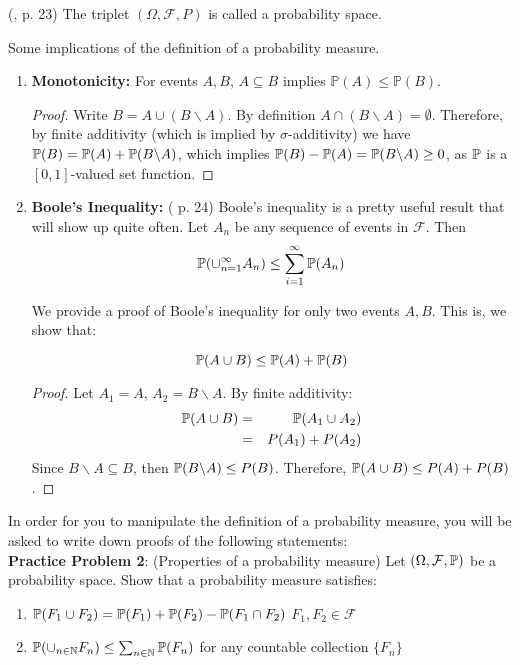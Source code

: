 \documentclass[11pt]{article} %
\begin{document}
\begin{definition} (\cite{Billingsley95}, p. 23)
The triplet $(\Omega, \mathcal{F}, P)$ is called a probability space. 
\end{definition}

Some implications of the definition of a probability measure. 

\begin{enumerate}

\item \textbf{Monotonicity:} For events $A,B$, $A \subseteq B$ implies $\mathbb{P}(A) \leq \mathbb{P}(B)$.

\begin{proof}
Write $B= A \cup (B \backslash A)$. By definition $A \cap (B\backslash A)=\emptyset$. Therefore, by finite additivity (which is implied by $\sigma$-additivity) we have $\mathbb{P}(B)=\mathbb{P}(A) + \mathbb{P}(B \backslash A)$, which implies $\mathbb{P}(B)-\mathbb{P}(A)= \mathbb{P}(B \backslash A) \geq 0$, as $\mathbb{P}$ is a $[0,1]$-valued set function.  
\end{proof}

\item \textbf{Boole's Inequality:} (\cite{Billingsley95} p. 24) Boole's inequality is a pretty useful result that will show up quite often.  Let $A_n$ be any sequence of events in $\mathcal{F}$. Then
$$\mathbb{P}(\cup_{n=1}^{\infty} A_n) \leq \sum_{i=1}^{\infty} \mathbb{P}(A_n)  $$

We provide a proof of Boole's inequality for only two events $A,B$. This is, we show that:

$$\mathbb{P}(A \cup B) \leq \mathbb{P}(A) + \mathbb{P}(B) $$

\begin{proof}
Let $A_1=A$, $A_2=B \backslash A$. By finite additivity:
\begin{eqnarray*}
\mathbb{P}(A \cup B) &=& \mathbb{P}(A_1 \cup A_2)\\
&=& P(A_1) + P(A_2)   
\end{eqnarray*}
Since $B \backslash A \subseteq B$, then $\mathbb{P}(B\backslash A) \leq P(B)$. Therefore, $\mathbb{P}(A \cup B) \leq P(A) + P(B)$. 
\end{proof}

\end{enumerate}

In order for you to manipulate the definition of a probability measure, you will be asked to write down proofs of the following statements:\\

\noindent \textbf{Practice Problem 2}: (Properties of a probability measure) Let $(\Omega, \mathcal{F}, \mathbb{P})$ be a probability space. Show that a probability measure satisfies:
\begin{enumerate}
\item $\mathbb{P}(F_1 \cup F_2) = \mathbb{P}(F_1) + \mathbb{P}(F_2) - \mathbb{P}(F_1 \cap F_2)$  $F_1,F_2 \in \mathcal{F}$
\item $\mathbb{P}(\cup_{n \in \mathbb{N}} F_n) \leq \sum_{n \in \mathbb{N}} \mathbb{P}(F_n) $ for any countable collection $\{F_n\}$
\end{enumerate}
\end{document}
